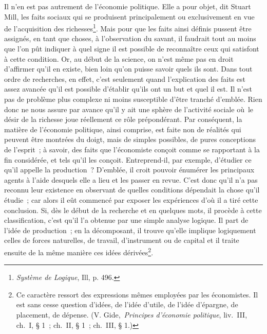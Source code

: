 \documentclass[french,twoside]{book} %
\begin{document}
Il n’en est pas autrement de l’économie politique. Elle a pour objet, dit Stuart Mill, les faits sociaux qui se produisent principalement ou exclusivement en vue de l’acquisition des richesses\footnote{\emph{Système de Logique}, Ill, p. 496.}. Mais pour que les faits ainsi définis pussent être assignés, en tant que choses, à l’observation du savant, il faudrait tout au moins que l’on pût indiquer à quel signe il est possible de reconnaître ceux qui satisfont à cette condition. Or, au début de la science, on n’est même pas en droit d’affirmer qu’il en existe, bien loin qu’on puisse savoir quels ils sont. Dans tout ordre de recherches, en effet, c’est seulement quand l’explication des faits est assez avancée qu’il est possible d’établir qu’ils ont un but et quel il est. Il n’est pas de problème plus complexe ni moins susceptible d’être tranché d’emblée. Rien donc ne nous assure par avance qu’il y ait une sphère de l’activité sociale où le désir de la richesse joue réellement ce rôle prépondérant. Par conséquent, la matière de l’économie politique, ainsi comprise, est faite non de réalités qui peuvent être montrées du doigt, mais de simples possibles, de pures conceptions de l’esprit ; à savoir, des faits que l’économiste conçoit comme se rapportant à la fin considérée, et tels qu’il les conçoit. Entreprend-il, par exemple, d’étudier ce qu’il appelle la production ? D’emblée, il croit pouvoir énumérer les principaux agents à l’aide desquels elle a lieu et les passer en revue. C’est donc qu’il n’a pas reconnu leur existence en observant de quelles conditions dépendait la chose qu’il étudie ; car alors il eût commencé par exposer les expériences d’où il a tiré cette conclusion. Si, dès le début de la recherche et en quelques mots, il procède à cette classification, c’est qu’il l’a obtenue par une simple analyse logique. Il part de l’idée de production ; en la décomposant, il trouve qu’elle implique logiquement celles de forces naturelles, de travail, d’instrument ou de capital et il traite ensuite de la même manière ces idées dérivées\footnote{ Ce caractère ressort des expressions mêmes employées par les économistes. Il est sans cesse question d’idées, de l’idée d’utile, de l’idée d’épargne, de placement, de dépense. (V. Gide, \emph{Principes d’économie politique}, liv. III, ch. I, § 1 ; ch. II, § 1 ; ch. III, § 1.)}.\par
\end{document}
